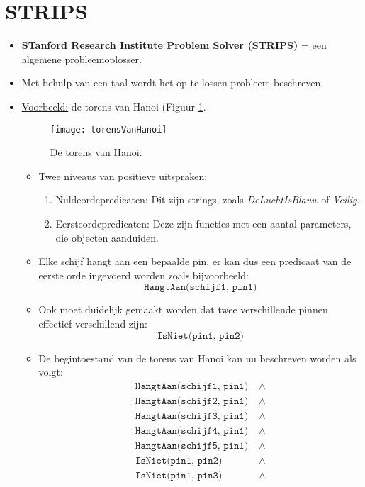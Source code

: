 \section{STRIPS}
\begin{itemize}
	\item \textbf{STanford Research Institute Problem Solver (STRIPS)} = een algemene probleemoplosser.
	\item Met behulp van een taal wordt het op te lossen probleem beschreven.
	\item \underline{Voorbeeld:} de torens van Hanoi (Figuur \ref{fig:torensVanHanoi}.
	\begin{figure}[h]
		\centering
		\texttt{[image: torensVanHanoi]}
		\caption{De torens van Hanoi.}
		\label{fig:torensVanHanoi}
	\end{figure}
	\begin{itemize}
		\item Twee niveaus van positieve uitspraken:
		\begin{enumerate}
			\item Nuldeordepredicaten: Dit zijn strings, zoals \textit{DeLuchtIsBlauw} of \textit{Veilig}.
			\item Eersteordepredicaten: Deze zijn functies met een aantal parameters, die objecten aanduiden.
		\end{enumerate}
		\item Elke schijf hangt aan een bepaalde pin, er kan dus een predicaat van de eerste orde ingevoerd worden zoals bijvoorbeeld:
		$$\texttt{HangtAan(schijf1, pin1)}$$
		\item Ook moet duidelijk gemaakt worden dat twee verschillende pinnen effectief verschillend zijn:
		$$\texttt{IsNiet(pin1, pin2)}$$
		\item De begintoestand van de torens van Hanoi kan nu beschreven worden als volgt:
		\begin{equation*}
			\begin{split}
				\texttt{HangtAan(schijf1, pin1)}& \;\wedge \\
				\texttt{HangtAan(schijf2, pin1)}& \;\wedge \\
				\texttt{HangtAan(schijf3, pin1)}& \;\wedge \\
				\texttt{HangtAan(schijf4, pin1)}& \;\wedge \\
				\texttt{HangtAan(schijf5, pin1)}& \;\wedge \\
				\texttt{IsNiet(pin1, pin2)}& \;\wedge \\
				\texttt{IsNiet(pin1, pin3)}& \;\wedge \\

\end{split}
\end{equation*}
\end{itemize}
\end{itemize}
